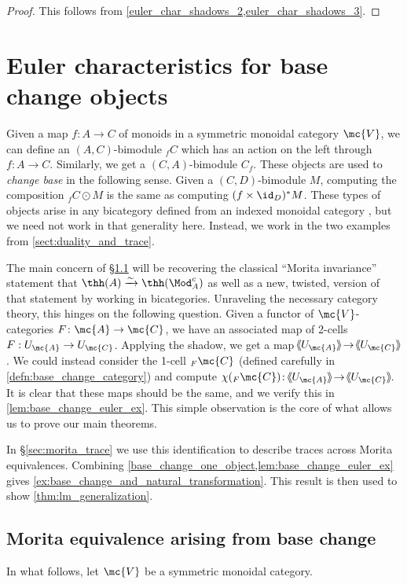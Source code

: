 \documentclass[11pt]{amsart}
\def\shvar#1#2{{\ensuremath{%
  \hspace{1mm}\makebox[-1mm]{$#1\langle$}\makebox[0mm]{$#1\langle$}\hspace{1mm}%
  {#2}%
  \makebox[1mm]{$#1\rangle$}\makebox[0mm]{$#1\rangle$}%
}}}
\def\sh{\shvar{}}
\begin{document}
\begin{proof}
This follows from \cref{euler_char_shadows_2,euler_char_shadows_3}. 
\end{proof}


\section{Euler characteristics for base change objects}\label{sect:euler_char}

Given a map $f\colon  A \to C$ of monoids in a symmetric monoidal category $\mc{V}$, we can define an $(A, C)$-bimodule $ _f C$ which has an action on the left through $f\colon  A \to C$. Similarly, we get a $(C, A)$-bimodule $C_f$. These objects are used to \textit{change base} in the following sense. Given a $(C,D)$-bimodule $M$, computing the composition $_f C\odot  M$ is the same as computing $(f\times \id_D)^\ast M$. 
These types of objects arise in any bicategory defined from an indexed monoidal category \cite{ps:indexed}, but we need not work in that generality here. Instead, we work in the two examples from \cref{sect:duality_and_trace}.

The main concern of \S\ref{sec:morita_base_change} will be recovering the classical ``Morita invariance'' statement that $\thh(A) \xrightarrow{\sim} \thh(\Mod^c_A)$ as well as a new, twisted, version of that statement by working in bicategories. Unraveling the necessary category theory, this hinges on the following question. Given a functor of $\mc{V}$-categories $F\colon  \mc{A} \to \mc{C}$, we have an associated map of 2-cells $F: U_{\mc{A}} \to U_{\mc{C}}$. Applying the shadow, we get a map $\sh{U_{\mc{A}}} \to \sh{U_{\mc{C}}}$. We could instead consider the 1-cell $_F \mc{C}$ (defined carefully in \cref{defn:base_change_category}) and compute $\chi (_F \mc{C}) \colon  \sh{U_{\mc{A}}} \to \sh{U_{\mc{C}}}$. It is clear that these maps should be the same, and we verify this in \cref{lem:base_change_euler_ex}. This simple observation is the core of what allows us to prove our main theorems. 

In \S\ref{sec:morita_trace} we use this identification to describe traces across Morita equivalences. 
Combining \cref{base_change_one_object,lem:base_change_euler_ex} gives 
\cref{ex:base_change_and_natural_transformation}.  This result is then used to show \cref{thm:lm_generalization}.

\subsection{Morita equivalence arising from base change}\label{sec:morita_base_change}
In what follows, let $\mc{V}$ be a symmetric monoidal category.
\end{document}
